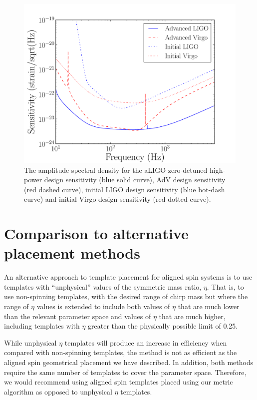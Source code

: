 \begin{figure}
\begin{center}
\includegraphics[width=1.0\textwidth]{papers/bns_spin/figure6.pdf}
\end{center}
\caption{\label{fig:asd_comparison} The amplitude spectral density for the aLIGO
zero-detuned high-power design sensitivity (blue solid curve), AdV design sensitivity
(red dashed curve), initial LIGO design sensitivity (blue bot-dash curve) and initial
Virgo design sensitivity (red dotted curve).}
\end{figure}

\section{Comparison to alternative placement methods}

An alternative approach to template placement for aligned spin systems is to use templates
with ``unphysical'' values of the symmetric mass ratio, $\eta$.
That is, to use non-spinning templates, with the desired range of chirp
mass but where the range of $\eta$ values is extended to include both values of $\eta$ that are much lower than
the relevant parameter space and values of $\eta$ that are much higher,
including templates with $\eta$ greater than the physically possible limit of 0.25.

While unphysical $\eta$ templates will produce an increase in efficiency when compared with non-spinning templates, the
method is not as efficient as the aligned spin geometrical placement we have described. In addition, both methods
require the same number of templates to cover the parameter space. Therefore, we would recommend using aligned spin templates
placed using our metric algorithm as opposed to unphysical $\eta$ templates.

